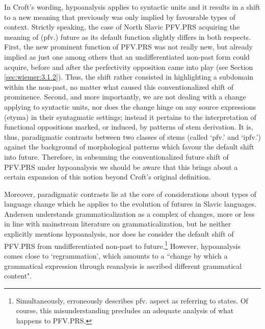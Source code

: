 \documentclass[output=paper,colorlinks,citecolor=brown]{langscibook}
\begin{document}
In Croft’s wording, hypoanalysis applies to syntactic units and it results in a shift to a new meaning that previously was only implied by favourable types of context. Strictly speaking, the case of North Slavic PFV.PRS acquiring the meaning of (pfv.) future as its default function slightly differs in both respects. First, the new prominent function of PFV.PRS was not really new, but already implied as just one among others that an undifferentiated non-past form could acquire, before and after the perfectivity opposition came into play (see Section \ref{sec:wiemer:3.1.2}). Thus, the shift rather consisted in highlighting a subdomain within the non-past, no matter what caused this conventionalized shift of prominence. Second, and more importantly, we are not dealing with a change applying to syntactic units, nor does the change hinge on any source expressions (etyma) in their syntagmatic settings; instead it pertains to the interpretation of functional oppositions marked, or induced, by patterns of stem derivation. It is, thus, paradigmatic contrasts between two classes of stems (called ‘pfv.’ and ‘ipfv.’) against the background of morphological patterns which favour the default shift into future. Therefore, in subsuming the conventionalized future shift of PFV.PRS under hypoanalysis we should be aware that this brings about a certain expansion of this notion beyond Croft’s original definition.

Moreover, paradigmatic contrasts lie at the core of  considerations about types of language change which he applies to the evolution of futures in Slavic languages. Andersen understands grammaticalization as a complex of changes, more or less in line with mainstream literature on grammaticalization, but he neither explicitly mentions hypoanalysis, nor does he consider the default shift of PFV.PRS from undifferentiated non-past to future.\footnote{Simultaneously, \citet[31]{andersen_2006b} erroneously describes pfv. aspect as referring to states. Of course, this misunderstanding precludes an adequate analysis of what happens to PFV.PRS.} However, hypoanalysis comes close to  ‘regrammation’, which amounts to a ``change by which a grammatical expression through reanalysis is ascribed different grammatical content".
\end{document}
